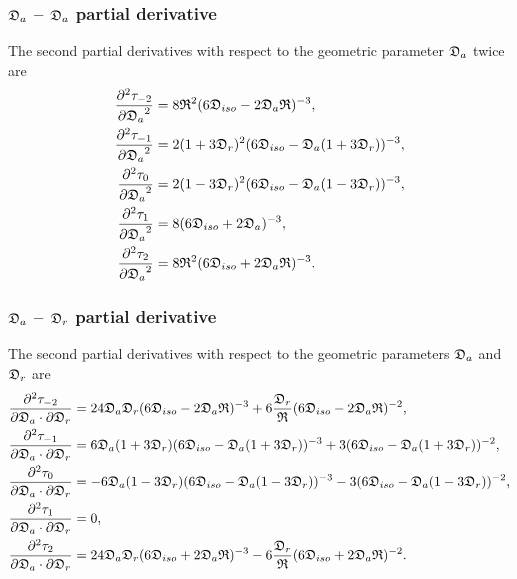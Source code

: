 \subsubsection{$\mathfrak{D}_a$ -- $\mathfrak{D}_a$ partial derivative}

The second partial derivatives with respect to the geometric parameter $\mathfrak{D}_a$ twice are
\begin{subequations}
\begin{align}
    \frac{\partial^2 \tau_{-2}}{{\partial \mathfrak{D}_a}^2} &= 8\mathfrak{R}^2 (6\mathfrak{D}_{iso} - 2\mathfrak{D}_a\mathfrak{R})^{-3}, \\
    \frac{\partial^2 \tau_{-1}}{{\partial \mathfrak{D}_a}^2} &= 2(1 + 3\mathfrak{D}_r)^2 (6\mathfrak{D}_{iso} - \mathfrak{D}_a (1 + 3\mathfrak{D}_r))^{-3}, \\
    \frac{\partial^2 \tau_{0}}{{\partial \mathfrak{D}_a}^2}  &= 2(1 - 3\mathfrak{D}_r)^2 (6\mathfrak{D}_{iso} - \mathfrak{D}_a (1 - 3\mathfrak{D}_r))^{-3}, \\
    \frac{\partial^2 \tau_{1}}{{\partial \mathfrak{D}_a}^2}  &= 8 (6\mathfrak{D}_{iso} + 2\mathfrak{D}_a)^{-3}, \\
    \frac{\partial^2 \tau_{2}}{{\partial \mathfrak{D}_a}^2}  &= 8\mathfrak{R}^2 (6\mathfrak{D}_{iso} + 2\mathfrak{D}_a\mathfrak{R})^{-3}.
\end{align}
\end{subequations}



\subsubsection{$\mathfrak{D}_a$ -- $\mathfrak{D}_r$ partial derivative}

The second partial derivatives with respect to the geometric parameters $\mathfrak{D}_a$ and $\mathfrak{D}_r$ are
\begin{subequations}
\begin{align}
    \frac{\partial^2 \tau_{-2}}{\partial \mathfrak{D}_a \cdot \partial \mathfrak{D}_r} &= 24 \mathfrak{D}_a \mathfrak{D}_r (6\mathfrak{D}_{iso} - 2\mathfrak{D}_a\mathfrak{R})^{-3}
        + 6 \frac{\mathfrak{D}_r}{\mathfrak{R}} (6\mathfrak{D}_{iso} - 2\mathfrak{D}_a\mathfrak{R})^{-2}, \\
    \frac{\partial^2 \tau_{-1}}{\partial \mathfrak{D}_a \cdot \partial \mathfrak{D}_r} &= 6\mathfrak{D}_a(1 + 3\mathfrak{D}_r) (6\mathfrak{D}_{iso} - \mathfrak{D}_a (1 + 3\mathfrak{D}_r))^{-3}
        + 3 (6\mathfrak{D}_{iso} - \mathfrak{D}_a (1 + 3\mathfrak{D}_r))^{-2}, \\
    \frac{\partial^2 \tau_{0}}{\partial \mathfrak{D}_a \cdot \partial \mathfrak{D}_r}  &= -6\mathfrak{D}_a(1 - 3\mathfrak{D}_r) (6\mathfrak{D}_{iso} - \mathfrak{D}_a (1 - 3\mathfrak{D}_r))^{-3}
        - 3 (6\mathfrak{D}_{iso} - \mathfrak{D}_a (1 - 3\mathfrak{D}_r))^{-2}, \\
    \frac{\partial^2 \tau_{1}}{\partial \mathfrak{D}_a \cdot \partial \mathfrak{D}_r}  &= 0, \\
    \frac{\partial^2 \tau_{2}}{\partial \mathfrak{D}_a \cdot \partial \mathfrak{D}_r}  &= 24 \mathfrak{D}_a \mathfrak{D}_r (6\mathfrak{D}_{iso} + 2\mathfrak{D}_a\mathfrak{R})^{-3}
        - 6 \frac{\mathfrak{D}_r}{\mathfrak{R}} (6\mathfrak{D}_{iso} + 2\mathfrak{D}_a\mathfrak{R})^{-2}.
\end{align}
\end{subequations}



